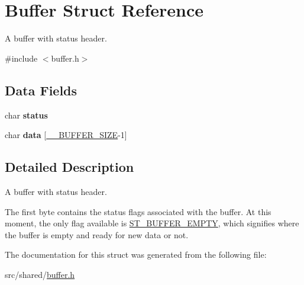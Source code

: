 \hypertarget{structbuffer}{\section{Buffer Struct Reference}
\label{structbuffer}
}


A buffer with status header.  




{\ttfamily \#include $<$buffer.\-h$>$}

\subsection*{Data Fields}
\begin{DoxyCompactItemize}
\item 
\hypertarget{structbuffer_a051c9e198ee930358372c407a17e8b78}{char {\bfseries status}}\label{structbuffer_a051c9e198ee930358372c407a17e8b78}

\item 
\hypertarget{structbuffer_a8c7fa68ebb2b103a999a3bc74998259a}{char {\bfseries data} \mbox{[}\hyperlink{buffer_8h_a3063b847e4252503da6763594dfd1811}{\-\_\-\-\_\-\-B\-U\-F\-F\-E\-R\-\_\-\-S\-I\-Z\-E}-\/1\mbox{]}}\label{structbuffer_a8c7fa68ebb2b103a999a3bc74998259a}

\end{DoxyCompactItemize}


\subsection{Detailed Description}
A buffer with status header. 

The first byte contains the status flags associated with the buffer. At this moment, the only flag available is \hyperlink{buffer_8h_aba617d84db78af124c9bf1b7b87fefef}{S\-T\-\_\-\-B\-U\-F\-F\-E\-R\-\_\-\-E\-M\-P\-T\-Y}, which signifies where the buffer is empty and ready for new data or not. 

The documentation for this struct was generated from the following file\-:\begin{DoxyCompactItemize}
\item 
src/shared/\hyperlink{buffer_8h}{buffer.\-h}\end{DoxyCompactItemize}
